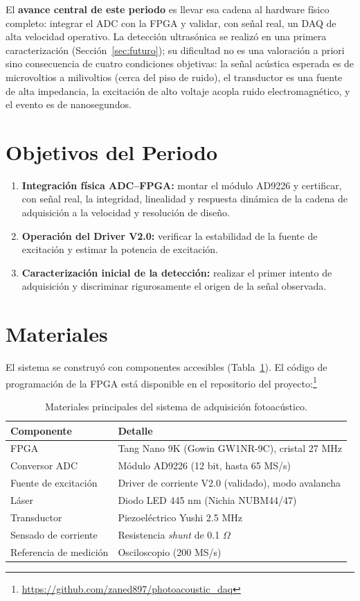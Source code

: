 \documentclass[12pt,letterpaper]{article}
\begin{document}
El \textbf{avance central de este periodo} es llevar esa cadena al hardware físico
completo: integrar el ADC con la FPGA y validar, con señal real, un DAQ de alta
velocidad operativo. La detección ultrasónica se realizó en una primera
caracterización (Sección~\ref{sec:futuro}); su dificultad no es una valoración a
priori sino consecuencia de cuatro condiciones objetivas: la señal acústica esperada
es de microvoltios a milivoltios (cerca del piso de ruido), el transductor es una
fuente de alta impedancia, la excitación de alto voltaje acopla ruido
electromagnético, y el evento es de nanosegundos.

\section{Objetivos del Periodo}
\begin{enumerate}
    \item \textbf{Integración física ADC--FPGA:} montar el módulo AD9226 y certificar,
    con señal real, la integridad, linealidad y respuesta dinámica de la cadena de
    adquisición a la velocidad y resolución de diseño.
    \item \textbf{Operación del Driver V2.0:} verificar la estabilidad de la fuente de
    excitación y estimar la potencia de excitación.
    \item \textbf{Caracterización inicial de la detección:} realizar el primer intento
    de adquisición y discriminar rigurosamente el origen de la señal observada.
\end{enumerate}

\section{Materiales}
El sistema se construyó con componentes accesibles (Tabla~\ref{tab:materiales}). El
código de programación de la FPGA está disponible en el repositorio del
proyecto:\footnote{\url{https://github.com/zaned897/photoacoustic_daq}}

\begin{table}[htbp]
\centering\small
\begin{tabular}{ll}
\toprule
\textbf{Componente} & \textbf{Detalle} \\
\midrule
FPGA & Tang Nano 9K (Gowin GW1NR-9C), cristal 27 MHz \\
Conversor ADC & Módulo AD9226 (12 bit, hasta 65 MS/s) \\
Fuente de excitación & Driver de corriente V2.0 (validado), modo avalancha \\
Láser & Diodo LED 445 nm (Nichia NUBM44/47) \\
Transductor & Piezoeléctrico Yushi 2.5 MHz \\
Sensado de corriente & Resistencia \textit{shunt} de 0.1 $\Omega$ \\
Referencia de medición & Osciloscopio (200 MS/s) \\
\bottomrule
\end{tabular}
\caption{Materiales principales del sistema de adquisición fotoacústico.}
\label{tab:materiales}
\end{table}
\end{document}
